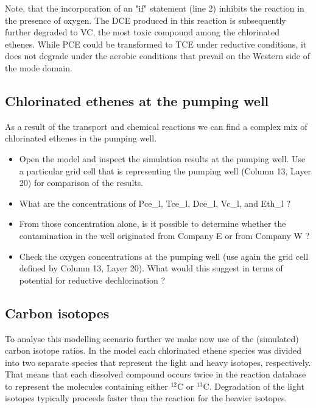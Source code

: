 Note, that the incorporation of an "if" statement (line 2) inhibits the reaction in the presence of oxygen. 
The DCE produced in this reaction is subsequently further degraded to VC, the most toxic 
compound among the chlorinated ethenes. 
While PCE could be transformed to TCE under reductive conditions, it does not degrade under the aerobic conditions that prevail on the Western side of the mode domain.

\subsection[Chlorinated ethenes at the pumping well]{Chlorinated ethenes at the pumping well}

As a result of the transport and chemical reactions we can find a complex mix of chlorinated ethenes in the pumping well.

\begin{itemize}

\item Open the model and inspect the simulation results at the pumping well.
Use a particular grid cell that is representing the pumping well 
(Column 13, Layer 20) for comparison of the results.

\item What are the concentrations of Pce\_l, Tce\_l, Dce\_l, Vc\_l, and Eth\_l ? 

\item From those concentration alone, is it possible to determine whether the contamination in the well 
originated from Company E or from Company W ? 

\item Check the oxygen concentrations at the pumping well (use again the grid cell defined by Column 13, Layer 20). 
What would this suggest in terms of potential for reductive dechlorination ? 

\end{itemize} 

\subsection[Carbon isotopes] {Carbon isotopes}

To analyse this modelling scenario further we make now use of the (simulated) carbon isotope ratios.
In the model each chlorinated ethene species was divided into two separate species that represent 
the light and heavy isotopes, respectively. 
That means that each dissolved compound occurs twice in the reaction database to represent the 
molecules containing either $^{12}$C or $^{13}$C. 
Degradation of the light isotopes typically 
proceeds faster than the reaction for the heavier isotopes.

